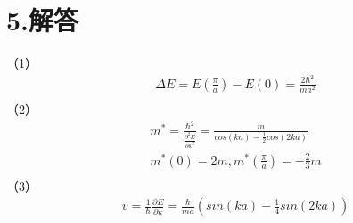 \documentclass[UTF8]{ctexart}
\begin{document}
\section*{\bfseries 5.解答}
（1）
\begin{equation*}
    \begin{aligned}
        & \Delta E=E(\frac{\pi}{a})-E(0)=\frac{2\hbar^2}{ma^2}\\
    \end{aligned}
\end{equation*}
（2）
\begin{equation*}
    \begin{aligned}
        & m^*=\frac{\hbar^2}{\frac{\partial^2E}{\partial k^2}}=\frac{m}{cos(ka)-\frac{1}{2}cos(2ka)}\\
        & m^*(0)=2m, m^*(\frac{\pi}{a})=-\frac{2}{3}m\\
    \end{aligned}
\end{equation*}
（3）
\begin{equation*}
    \begin{aligned}
        & v=\frac{1}{\hbar}\frac{\partial E}{\partial k}=\frac{\hbar}{ma}(sin(ka)-\frac{1}{4}sin(2ka))\\
    \end{aligned}
\end{equation*}
\end{document}
